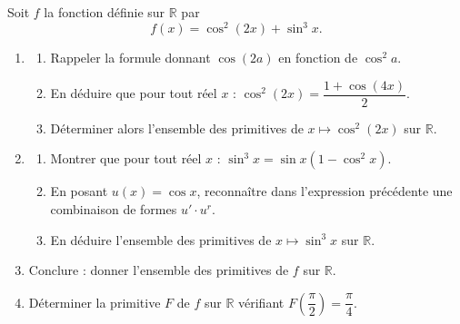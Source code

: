 \documentclass[11pt]{article}
\begin{document}
\begin{exercice}
Soit $f$ la fonction définie sur $\mathbb{R}$ par
\[ f(x) = \cos^2(2x) + \sin^3 x. \]
\begin{enumerate}
\item \begin{enumerate}
\item Rappeler la formule donnant $\cos(2a)$ en fonction de $\cos^2 a$.
\item En déduire que pour tout réel $x$ : $\cos^2(2x) = \dfrac{1 + \cos(4x)}{2}$.
\item Déterminer alors l'ensemble des primitives de $x \mapsto \cos^2(2x)$ sur $\mathbb{R}$.
\end{enumerate}
\item \begin{enumerate}
\item Montrer que pour tout réel $x$ : $\sin^3 x = \sin x \left(1 - \cos^2 x\right)$.
\item En posant $u(x) = \cos x$, reconnaître dans l'expression précédente une combinaison de formes $u' \cdot u^r$.
\item En déduire l'ensemble des primitives de $x \mapsto \sin^3 x$ sur $\mathbb{R}$.
\end{enumerate}
\item Conclure : donner l'ensemble des primitives de $f$ sur $\mathbb{R}$.
\item Déterminer la primitive $F$ de $f$ sur $\mathbb{R}$ vérifiant $F\left(\dfrac{\pi}{2}\right) = \dfrac{\pi}{4}$.
\end{enumerate}
\end{exercice}
\end{document}
